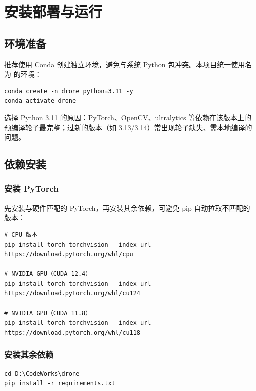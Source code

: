 \section{安装部署与运行}

\subsection{环境准备}

推荐使用 Conda 创建独立环境，避免与系统 Python 包冲突。本项目统一使用名为  的环境：

\begin{lstlisting}[style=sh, caption={创建并激活虚拟环境}]
conda create -n drone python=3.11 -y
conda activate drone
\end{lstlisting}

选择 Python 3.11 的原因：PyTorch、OpenCV、ultralytics 等依赖在该版本上的预编译轮子最完整；过新的版本（如 3.13/3.14）常出现轮子缺失、需本地编译的问题。

\subsection{依赖安装}

\subsubsection{安装 PyTorch}

先安装与硬件匹配的 PyTorch，再安装其余依赖，可避免 pip 自动拉取不匹配的版本：

\begin{lstlisting}[style=sh, caption={PyTorch 安装（按硬件三选一）}]
# CPU 版本
pip install torch torchvision --index-url https://download.pytorch.org/whl/cpu

# NVIDIA GPU（CUDA 12.4）
pip install torch torchvision --index-url https://download.pytorch.org/whl/cu124

# NVIDIA GPU（CUDA 11.8）
pip install torch torchvision --index-url https://download.pytorch.org/whl/cu118
\end{lstlisting}

\subsubsection{安装其余依赖}

\begin{lstlisting}[style=sh, caption={安装项目依赖}]
cd D:\CodeWorks\drone
pip install -r requirements.txt
\end{lstlisting}

